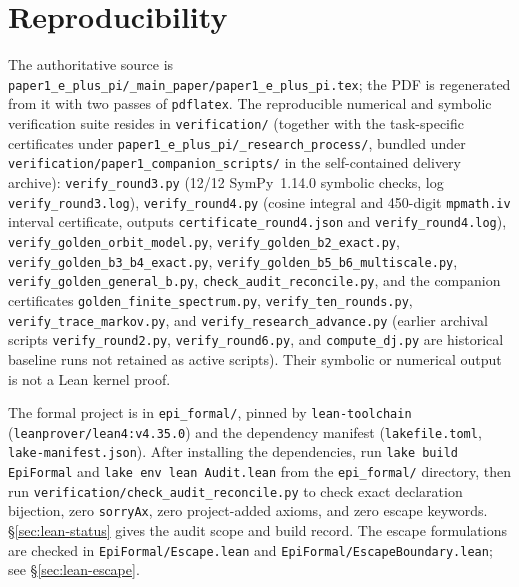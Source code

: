 \documentclass[11pt]{amsart}
\theoremstyle{definition}
\theoremstyle{remark}
\numberwithin{equation}{section}
\begin{document}
\section{Reproducibility}\label{app:repro}

The authoritative source is
\texttt{paper1\_\allowbreak e\_\allowbreak plus\_\allowbreak pi/\_\allowbreak main\_\allowbreak paper/\allowbreak paper1\_\allowbreak e\_\allowbreak plus\_\allowbreak pi.tex};
the PDF is regenerated from it with two passes of \texttt{pdflatex}.
The reproducible numerical and symbolic verification suite resides in
\texttt{verification/} (together with the task-specific certificates under
\texttt{paper1\_\allowbreak e\_\allowbreak plus\_\allowbreak pi/\_\allowbreak research\_\allowbreak process/},
bundled under \texttt{verification/\allowbreak paper1\_\allowbreak companion\_\allowbreak scripts/}
in the self-contained delivery archive):
\texttt{verify\_\allowbreak round3.py} (12/12 SymPy~1.14.0 symbolic checks, log
\texttt{verify\_\allowbreak round3.log}), \texttt{verify\_\allowbreak round4.py}
(cosine integral and 450-digit \texttt{mpmath.iv} interval certificate,
outputs \texttt{certificate\_\allowbreak round4.json} and
\texttt{verify\_\allowbreak round4.log}),
\texttt{verify\_\allowbreak golden\_\allowbreak orbit\_\allowbreak model.py},
\texttt{verify\_\allowbreak golden\_\allowbreak b2\_\allowbreak exact.py},
\texttt{verify\_\allowbreak golden\_\allowbreak b3\_\allowbreak b4\_\allowbreak exact.py},
\texttt{verify\_\allowbreak golden\_\allowbreak b5\_\allowbreak b6\_\allowbreak multiscale.py},
\texttt{verify\_\allowbreak golden\_\allowbreak general\_\allowbreak b.py},
\texttt{check\_\allowbreak audit\_\allowbreak reconcile.py}, and the
companion certificates \texttt{golden\_\allowbreak finite\_\allowbreak spectrum.py},
\texttt{verify\_\allowbreak ten\_\allowbreak rounds.py},
\texttt{verify\_\allowbreak trace\_\allowbreak markov.py}, and
\texttt{verify\_\allowbreak research\_\allowbreak advance.py}
(earlier archival scripts \texttt{verify\_\allowbreak round2.py},
\texttt{verify\_\allowbreak round6.py}, and \texttt{compute\_\allowbreak dj.py}
are historical baseline runs not retained as active scripts). Their
symbolic or numerical output is not a Lean kernel proof.

The formal project is in \texttt{epi\_formal/}, pinned by
\texttt{lean-toolchain} (\texttt{leanprover/lean4:v4.35.0}) and the
dependency manifest (\texttt{lakefile.toml}, \texttt{lake-manifest.json}).
After installing the dependencies, run \texttt{lake build EpiFormal} and
\texttt{lake env lean Audit.lean} from the \texttt{epi\_formal/} directory,
then run \texttt{verification/\allowbreak check\_\allowbreak audit\_\allowbreak reconcile.py}
to check exact declaration bijection, zero \texttt{sorryAx}, zero
project-added axioms, and zero escape keywords. \S\ref{sec:lean-status}
gives the audit scope and build record. The escape formulations are
checked in \texttt{EpiFormal/\allowbreak Escape.lean} and
\texttt{EpiFormal/\allowbreak EscapeBoundary.lean}; see
\S\ref{sec:lean-escape}.
\end{document}
